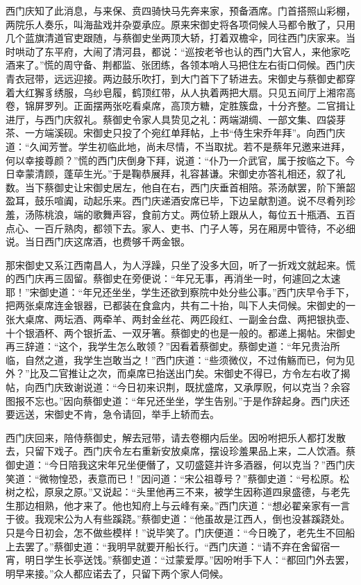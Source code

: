 西门庆知了此消息，与来保、贲四骑快马先奔来家，预备酒席。门首搭照山彩棚，两院乐人奏乐，叫海盐戏并杂耍承应。原来宋御史将各项伺候人马都令散了，只用几个蓝旗清道官吏跟随，与蔡御史坐两顶大轿，打着双檐伞，同往西门庆家来。当时哄动了东平府，大闹了清河县，都说：“巡按老爷也认的西门大官人，来他家吃酒来了。”慌的周守备、荆都监、张团练，各领本哨人马把住左右街口伺候。西门庆青衣冠带，远远迎接。两边鼓乐吹打，到大门首下了轿进去。宋御史与蔡御史都穿着大红獬豸绣服，乌纱皂履，鹤顶红带，从人执着两把大扇。只见五间厅上湘帘高卷，锦屏罗列。正面摆两张吃看桌席，高顶方糖，定胜簇盘，十分齐整。二官揖让进厅，与西门庆叙礼。蔡御史令家人具贽见之礼：两端湖绸、一部文集、四袋芽茶、一方端溪砚。宋御史只投了个宛红单拜帖，上书“侍生宋乔年拜”。向西门庆道：“久闻芳誉。学生初临此地，尚未尽情，不当取扰。若不是蔡年兄邀来进拜，何以幸接尊颜？”慌的西门庆倒身下拜，说道：“仆乃一介武官，属于按临之下。今日幸蒙清顾，蓬荜生光。”于是鞠恭展拜，礼容甚谦。宋御史亦答礼相还，叙了礼数。当下蔡御史让宋御史居左，他自在右，西门庆垂首相陪。茶汤献罢，阶下箫韶盈耳，鼓乐喧阗，动起乐来。西门庆递酒安席已毕，下边呈献割道。说不尽肴列珍羞，汤陈桃浪，端的歌舞声容，食前方丈。两位轿上跟从人，每位五十瓶酒、五百点心、一百斤熟肉，都领下去。家人、吏书、门子人等，另在厢房中管待，不必细说。当日西门庆这席酒，也费够千两金银。

那宋御史又系江西南昌人，为人浮躁，只坐了没多大回，听了一折戏文就起来。慌的西门庆再三固留。蔡御史在旁便说：“年兄无事，再消坐一时，何遽回之太速耶！”宋御史道：“年兄还坐坐，学生还欲到察院中处分些公事。”西门庆早令手下，把两张桌席连金银器，已都装在食盒内，共有二十抬，叫下人夫伺候。宋御史的一张大桌席、两坛酒、两牵羊、两封金丝花、两匹段红、一副金台盘、两把银执壶、十个银酒杯、两个银折盂、一双牙箸。蔡御史的也是一般的。都递上揭帖。宋御史再三辞道：“这个，我学生怎么敢领？”因看着蔡御史。蔡御史道：“年兄贵治所临，自然之道，我学生岂敢当之！”西门庆道：“些须微仪，不过侑觞而已，何为见外？”比及二官推让之次，而桌席已抬送出门矣。宋御史不得已，方令左右收了揭帖，向西门庆致谢说道：“今日初来识荆，既扰盛席，又承厚贶，何以克当？余容图报不忘也。”因向蔡御史道：“年兄还坐坐，学生告别。”于是作辞起身。西门庆还要远送，宋御史不肯，急令请回，举手上轿而去。

西门庆回来，陪侍蔡御史，解去冠带，请去卷棚内后坐。因吩咐把乐人都打发散去，只留下戏子。西门庆令左右重新安放桌席，摆设珍羞果品上来，二人饮酒。蔡御史道：“今日陪我这宋年兄坐便僭了，又叨盛筵并许多酒器，何以克当？”西门庆笑道：“微物惶恐，表意而已！”因问道：“宋公祖尊号？”蔡御史道：“号松原。松树之松，原泉之原。”又说起：“头里他再三不来，被学生因称道四泉盛德，与老先生那边相熟，他才来了。他也知府上与云峰有亲。”西门庆道：“想必翟亲家有一言于彼。我观宋公为人有些蹊跷。”蔡御史道：“他虽故是江西人，倒也没甚蹊跷处。只是今日初会，怎不做些模样！”说毕笑了。门庆便道：“今日晚了，老先生不回船上去罢了。”蔡御史道：“我明早就要开船长行。“西门庆道：“请不弃在舍留宿一宵，明日学生长亭送饯。”蔡御史道：“过蒙爱厚。”因吩咐手下人：“都回门外去罢，明早来接。”众人都应诺去了，只留下两个家人伺候。

